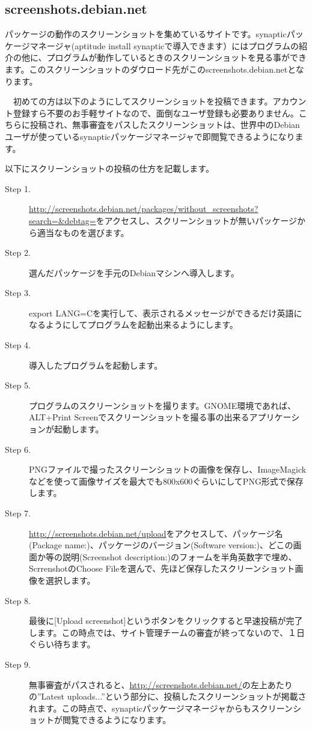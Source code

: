 \documentclass[mingoth,a4paper]{jsarticle}
\begin{document}
\subsection{screenshots.debian.net}

 パッケージの動作のスクリーンショットを集めているサイトです。synapticパッケージマネージャ(aptitude install synapticで導入できます）にはプログラムの紹介の他に、プログラムが動作しているときのスクリーンショットを見る事ができます。このスクリーンショットのダウロード先がこのscreenshots.debian.netとなります。

　初めての方は以下のようにしてスクリーンショットを投稿できます。アカウント登録すら不要のお手軽サイトなので、面倒なユーザ登録も必要ありません。こちらに投稿され、無事審査をパスしたスクリーンショットは、世界中のDebianユーザが使っているsynapticパッケージマネージャで即閲覧できるようになります。

以下にスクリーンショットの投稿の仕方を記載します。

 \begin{description}
 \item [Step 1.] \url{http://screenshots.debian.net/packages/without_screenshots?search=&debtag=}をアクセスし、スクリーンショットが無いパッケージから適当なものを選びます。
 \item [Step 2.] 選んだパッケージを手元のDebianマシンへ導入します。
 \item [Step 3.] export LANG=Cを実行して、表示されるメッセージができるだけ英語になるようにしてプログラムを起動出来るようにします。
 \item [Step 4.] 導入したプログラムを起動します。
 \item [Step 5.] プログラムのスクリーンショットを撮ります。GNOME環境であれば、ALT+Print Screenでスクリーンショットを撮る事の出来るアプリケーションが起動します。
 \item [Step 6.] PNGファイルで撮ったスクリーンショットの画像を保存し、ImageMagickなどを使って画像サイズを最大でも800x600ぐらいにしてPNG形式で保存します。
 \item [Step 7.] \url{http://screenshots.debian.net/upload}をアクセスして、パッケージ名(Package name:)、パッケージのバージョン(Software version:)、どこの画面か等の説明(Screenshot description:)のフォームを半角英数字で埋め、ScrrenshotのChoose Fileを選んで、先ほど保存したスクリーンショット画像を選択します。
\item [Step 8.] 最後に[Upload screenshot]というボタンをクリックすると早速投稿が完了します。この時点では、サイト管理チームの審査が終ってないので、１日ぐらい待ちます。
\item [Step 9.] 無事審査がパスされると、\url{http://screenshots.debian.net/}の左上あたりの''Latest uploads...''という部分に、投稿したスクリーンショットが掲載されます。この時点で、synapticパッケージマネージャからもスクリーンショットが閲覧できるようになります。
\end{description}
\end{document}
